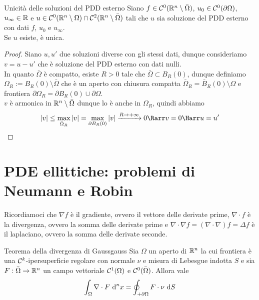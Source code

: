 \documentclass{article}
\begin{document}
\begin{theorem}{Unicità delle soluzioni del PDD esterno}{}
    Siano $f\in\mathcal{C}^0(\mathbb{R}^n\setminus\bar{\Omega})$, $u_0\in \mathcal{C}^0(\partial\Omega)$, $u_\infty \in \mathbb{R}$ e $u\in\mathcal{C}^0(\mathbb{R}^n\setminus\Omega)\cap\mathcal{C}^2(\mathbb{R}^n\setminus\bar{\Omega})$ tali che $u$ sia soluzione del PDD esterno con dati $f$, $u_0$ e $u_\infty$.\\
    Se $u$ esiste, è unica.
\end{theorem}
\begin{proof}
    Siano $u,u'$ due soluzioni diverse con gli stessi dati, dunque consideriamo $v = u-u'$ che è soluzione del PDD esterno con dati nulli.\\
    In quanto $\bar{\Omega}$ è compatto, esiste $R>0$ tale che $\bar{\Omega}\subset B_R(0)$, dunque definiamo $\Omega_R := B_R(0) \setminus \bar{\Omega}$ che è un aperto con chiusura compatta $\bar{\Omega}_R = \bar{B}_R(0)\setminus\Omega$ e frontiera $\partial\Omega_R = \partial B_R(0) \cup \partial\Omega$.\\
    $v$ è armonica in $\mathbb{R}^n\setminus \bar{\Omega}$ dunque lo è anche in $\Omega_R$, quindi abbiamo
    \[|v|\le \max_{\bar{\Omega}_R}|v| = \max_{\partial B_R(0)} |v| \xrightarrow{R\to +\infty} 0  \Rarr v = 0 \Harr u=u'\]
\end{proof}

\section{PDE ellittiche: problemi di Neumann e Robin}

\begin{notation}
    Ricordiamoci che $\nabla f$ è il gradiente, ovvero il vettore delle derivate prime, $\nabla \cdot f$ è la divergenza, ovvero la somma delle derivate prime e $\nabla\cdot\nabla f = (\nabla \cdot\nabla) f = \Delta f$ è il laplaciano, ovvero la somma delle derivate seconde.
\end{notation}

\begin{theorem}{Teorema della divergenza di Gauss}{gauss}
    Sia $\Omega$ un aperto di $\mathbb{R}^n$ la cui frontiera è una $\mathcal{C}^k$-ipersuperficie regolare con normale $\nu$ e misura di Lebesgue indotta $S$ e sia $F:\bar{\Omega}\to\mathbb{R}^n$ un campo vettoriale $\mathcal{C}^1(\Omega)$ e $\mathcal{C}^0(\bar{\Omega})$. Allora vale
    \[\int_\Omega \nabla \cdot F \text{ d}^n x = \oint_{+\partial\Omega} F \cdot\nu \text{ d} S\]
\end{theorem}
\end{document}
